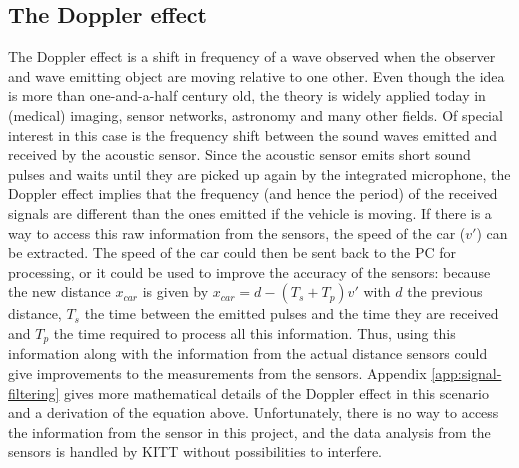 \documentclass[11pt,titlepage]{report}
\begin{document}
\subsection{The Doppler effect}
The Doppler effect is a shift in frequency of a wave observed when the observer and wave emitting object are moving relative to one other. Even though the idea is more than one-and-a-half century old, the theory is widely applied today in (medical) imaging, sensor networks, astronomy and many other fields. Of special interest in this case is the frequency shift between the sound waves emitted and received by the acoustic sensor. 
Since the acoustic sensor emits short sound pulses and waits until they are picked up again by the integrated microphone, the Doppler effect implies that the frequency (and hence the period) of the received signals are different than the ones emitted if the vehicle is moving. If there is a way to access this raw information from the sensors, the speed of the car ($v'$) can be extracted. The speed of the car could then be sent back to the PC for processing, or it could be used to improve the accuracy of the sensors: because the new distance $x_{car}$ is given by $x_{car}=d-(T_s+T_p)v'$ with $d$ the previous distance, $T_s$ the time between the emitted pulses and the time they are received and $T_p$ the time required to process all this information. Thus, using this information along with the information from the actual distance sensors could give improvements to the measurements from the sensors. Appendix \ref{app:signal-filtering} gives more mathematical details of the Doppler effect in this scenario and a derivation of the equation above. Unfortunately, there is no way to access the information from the sensor in this project, and the data analysis from the sensors is handled by KITT without possibilities to interfere.
\end{document}
